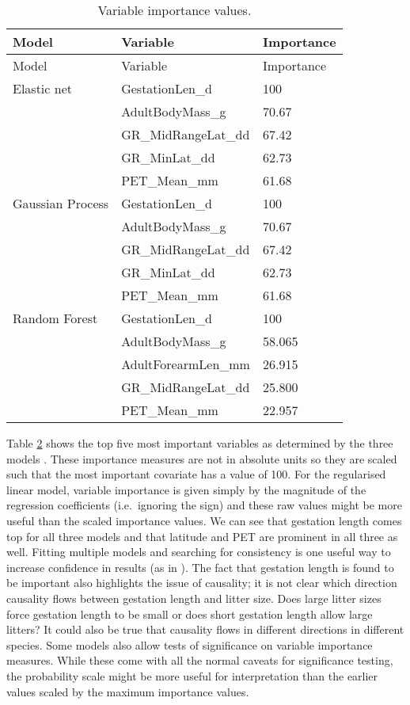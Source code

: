 \documentclass[10pt,]{article}
\begin{document}
\begin{table}[t!]
\begin{longtable}[c]{@{}lll@{}}
\caption{Variable importance values. \label{tbl:varimp}}\tabularnewline
\toprule
Model & Variable & Importance\tabularnewline
\midrule
\endfirsthead
\toprule
Model & Variable & Importance\tabularnewline
\midrule
\endhead
Elastic net & GestationLen\_d & 100\tabularnewline
& AdultBodyMass\_g & 70.67\tabularnewline
& GR\_MidRangeLat\_dd & 67.42\tabularnewline
& GR\_MinLat\_dd & 62.73\tabularnewline
& PET\_Mean\_mm & 61.68\tabularnewline
Gaussian Process & GestationLen\_d & 100\tabularnewline
& AdultBodyMass\_g & 70.67\tabularnewline
& GR\_MidRangeLat\_dd & 67.42\tabularnewline
& GR\_MinLat\_dd & 62.73\tabularnewline
& PET\_Mean\_mm & 61.68\tabularnewline
Random Forest & GestationLen\_d & 100\tabularnewline
& AdultBodyMass\_g & 58.065\tabularnewline
& AdultForearmLen\_mm & 26.915\tabularnewline
& GR\_MidRangeLat\_dd & 25.800\tabularnewline
& PET\_Mean\_mm & 22.957\tabularnewline
\bottomrule
\end{longtable}
\end{table}

Table \ref{tbl:varimp} shows the top five most important variables as determined by the three models \citep{oppel2009alternative}. These importance measures are not in absolute units so they are scaled such that the most important covariate has a value of 100. For the regularised linear model, variable importance is given simply by the magnitude of the regression coefficients (i.e.~ignoring the sign) and these raw values might be more useful than the scaled importance values. We can see that gestation length comes top for all three models and that latitude and PET are prominent in all three as well. Fitting multiple models and searching for consistency is one useful way to increase confidence in results (as in \citet{appelhans2015evaluating}). The fact that gestation length is found to be important also highlights the issue of causality; it is not clear which direction causality flows between gestation length and litter size. Does large litter sizes force gestation length to be small or does short gestation length allow large litters? It could also be true that causality flows in different directions in different species. Some models also allow tests of significance on variable importance measures. While these come with all the normal caveats for significance testing, the probability scale might be more useful for interpretation than the earlier values scaled by the maximum importance values.
\end{document}

